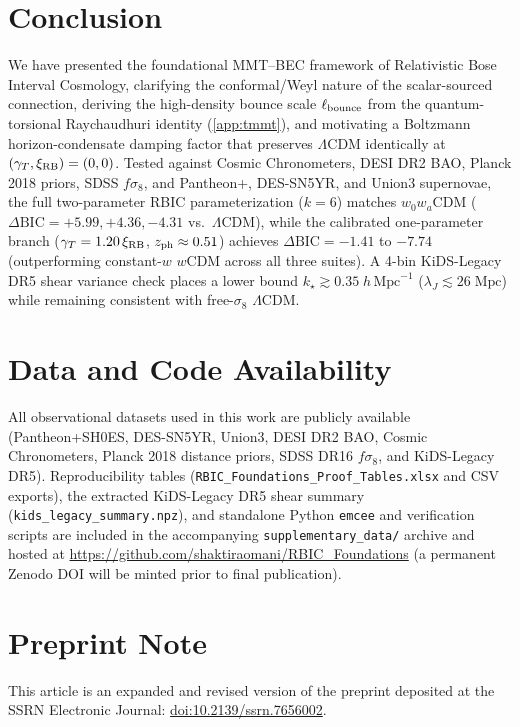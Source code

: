 \documentclass[preprint,12pt]{elsarticle}
\begin{document}
\section{Conclusion}
\label{sec:conclusion}

We have presented the foundational MMT--BEC framework of Relativistic Bose Interval Cosmology, clarifying the conformal/Weyl nature of the scalar-sourced connection, deriving the high-density bounce scale $\ell_{\rm bounce}$ from the quantum-torsional Raychaudhuri identity (\ref{app:tmmt}), and motivating a Boltzmann horizon-condensate damping factor that preserves $\Lambda$CDM identically at $(\gamma_T, \xi_{\rm RB}) = (0,0)$. Tested against Cosmic Chronometers, DESI DR2 BAO, Planck 2018 priors, SDSS $f\sigma_8$, and Pantheon+, DES-SN5YR, and Union3 supernovae, the full two-parameter RBIC parameterization ($k=6$) matches $w_0w_a$CDM ($\Delta\mathrm{BIC} = +5.99, +4.36, -4.31$ vs.\ $\Lambda$CDM), while the calibrated one-parameter branch ($\gamma_T = 1.20\,\xi_{\rm RB}$, $z_{\rm ph} \approx 0.51$) achieves $\Delta\mathrm{BIC} = -1.41$ to $-7.74$ (outperforming constant-$w$ $w$CDM across all three suites). A 4-bin KiDS-Legacy DR5 shear variance check places a lower bound $k_\star \gtrsim 0.35\;h\,\mathrm{Mpc}^{-1}$ ($\lambda_J \lesssim 26\;\mathrm{Mpc}$) while remaining consistent with free-$\sigma_8$ $\Lambda$CDM.

\section*{Data and Code Availability}
All observational datasets used in this work are publicly available (Pantheon+SH0ES, DES-SN5YR, Union3, DESI DR2 BAO, Cosmic Chronometers, Planck 2018 distance priors, SDSS DR16 $f\sigma_8$, and KiDS-Legacy DR5). Reproducibility tables (\texttt{RBIC\_Foundations\_Proof\_Tables.xlsx} and CSV exports), the extracted KiDS-Legacy DR5 shear summary (\texttt{kids\_legacy\_summary.npz}), and standalone Python \texttt{emcee} and verification scripts are included in the accompanying \texttt{supplementary\_data/} archive and hosted at \url{https://github.com/shaktiraomani/RBIC_Foundations} (a permanent Zenodo DOI will be minted prior to final publication).

\section*{Preprint Note}
This article is an expanded and revised version of the preprint deposited at the SSRN Electronic Journal: \href{https://ssrn.com/abstract=7656002}{doi:10.2139/ssrn.7656002}.
\end{document}
